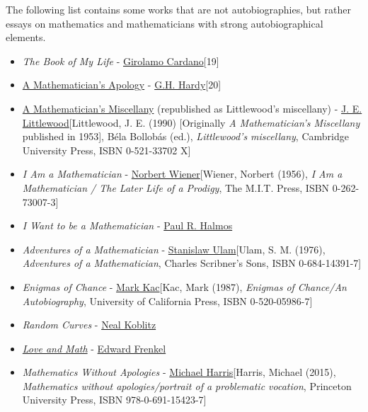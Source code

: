 \documentclass{article}
\begin{document}
The following list contains some works that are not autobiographies, but rather essays on mathematics and mathematicians with strong autobiographical elements.
\begin{itemize}
	\item \textit{The Book of My Life} - \href{https://en.wikipedia.org/wiki/Girolamo_Cardano}{Girolamo Cardano}[19]
	\item \href{https://en.wikipedia.org/wiki/A_Mathematician's_Apology}{A Mathematician's Apology} - \href{https://en.wikipedia.org/wiki/G.H._Hardy}{G.H. Hardy}[20]
	\item \href{https://en.wikipedia.org/wiki/A_Mathematician's_Miscellany}{A Mathematician's Miscellany} (republished as Littlewood's miscellany) - \href{https://en.wikipedia.org/wiki/J._E._Littlewood}{J. E. Littlewood}[Littlewood, J. E. (1990) [Originally \textit{A Mathematician's Miscellany} published in 1953], Béla Bollobás (ed.), \textit{Littlewood's miscellany}, Cambridge University Press, ISBN 0-521-33702 X]
	\item \textit{I Am a Mathematician} - \href{https://en.wikipedia.org/wiki/Norbert_Wiener}{Norbert Wiener}[Wiener, Norbert (1956), \textit{I Am a Mathematician / The Later Life of a Prodigy}, The M.I.T. Press, ISBN 0-262-73007-3]
	\item \textit{I Want to be a Mathematician} - \href{https://en.wikipedia.org/wiki/Paul_R._Halmos}{Paul R. Halmos}
	\item \textit{Adventures of a Mathematician} - \href{https://en.wikipedia.org/wiki/Stanislaw_Ulam}{Stanislaw Ulam}[Ulam, S. M. (1976), \textit{Adventures of a Mathematician}, Charles Scribner's Sons, ISBN 0-684-14391-7]
	\item \textit{Enigmas of Chance} - \href{https://en.wikipedia.org/wiki/Mark_Kac}{Mark Kac}[Kac, Mark (1987), \textit{Enigmas of Chance/An Autobiography}, University of California Press, ISBN 0-520-05986-7]
	\item \textit{Random Curves} - \href{https://en.wikipedia.org/wiki/Neal_Koblitz}{Neal Koblitz}
	\item \href{https://en.wikipedia.org/wiki/Edward_Frenkel#Love_and_Math}{\textit{Love and Math}} - \href{https://en.wikipedia.org/wiki/Edward_Frenkel}{Edward Frenkel}
	\item \textit{Mathematics Without Apologies} - \href{https://en.wikipedia.org/wiki/Michael_Harris_(mathematician)}{Michael Harris}[Harris, Michael (2015), \textit{Mathematics without apologies/portrait of a problematic vocation}, Princeton University Press, ISBN 978-0-691-15423-7]
\end{itemize}
\end{document}

